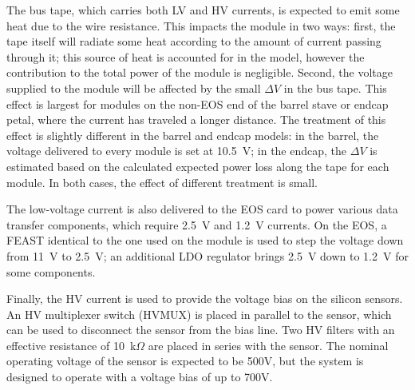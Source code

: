 The bus tape, which carries both LV and HV currents, is expected to emit some heat due to the wire
resistance. This impacts the module in two ways:
first,
the tape itself will radiate some heat according to the amount of current passing through it; this
source of heat is accounted for in the model, however the contribution to the total power of the module
is negligible.
Second,
the voltage supplied to the module will be affected by the small $\Delta V$ in the bus tape. This
effect is largest for modules on the non-EOS end of the barrel stave or endcap petal, where the current
has traveled a longer distance. The treatment of this effect is slightly different in the barrel and
endcap models: in the barrel, the voltage delivered to every module is set at 10.5~V; in the endcap,
the $\Delta V$ is estimated based on the calculated expected power loss along the tape for each module.
In both cases, the effect of different treatment is small.

The low-voltage current is also delivered to the EOS card to power various data transfer components,
which require 2.5~V and 1.2~V currents.
On the EOS, a FEAST identical to the one used on the module is used to step the voltage down from 11~V
to 2.5~V; an additional LDO regulator brings  2.5~V down to 1.2~V for some components.

Finally, the HV current is used to provide the voltage bias on the silicon sensors. An HV multiplexer
switch (HVMUX) is placed in parallel to the sensor, which can be used to disconnect the sensor from the
bias line. Two HV filters with an effective resistance of 10~k$\Omega$ are placed in series with the
sensor. The nominal operating voltage of the sensor is expected to be 500V, but the system is designed
to operate with a voltage bias of up to 700V.
